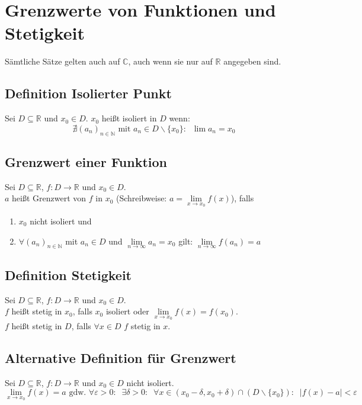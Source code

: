 \documentclass[halfparscip]{scrartcl}
\newcounter{subsection2}
\begin{document}
\newpage
\section{Grenzwerte von Funktionen und Stetigkeit}
\noindent Sämtliche Sätze gelten auch auf $\mathbb{C}$, auch wenn sie nur auf $\mathbb{R}$ angegeben sind.
\subsection{Definition Isolierter Punkt}
Sei $D \subseteq \mathbb{R}$ und $x_0 \in D$. $x_0$ heißt isoliert in $D$ wenn:
\begin{equation*}
\nexists (a_n)_{n \in \mathbb{N}} \text{ mit } a_n \in D \backslash \{x_0\}: \;\; \lim a_n = x_0
\end{equation*}

\subsection{Grenzwert einer Funktion}
Sei $D \subseteq \mathbb{R}$, $f: D \rightarrow \mathbb{R}$ und $x_0 \in D$.\\
$a$ heißt Grenzwert von $f$ in $x_0$ (Schreibweise: $a = \lim\limits_{x \rightarrow x_0} f(x)$), falls 
\begin{enumerate}[label=\alph*.]
	\item $x_0$ nicht isoliert und
	\item $\forall (a_n)_{n \in \mathbb{N}}$ mit $a_n \in D$ und $\lim\limits_{n \rightarrow \infty} a_n = x_0$ gilt: $\lim\limits_{n \rightarrow \infty} f(a_n) = a$
\end{enumerate}

\subsection{Definition Stetigkeit}
Sei $D \subseteq \mathbb{R}$, $f: D \rightarrow \mathbb{R}$ und $x_0 \in D$.\\
$f$ heißt stetig in $x_0$, falls $x_0$ isoliert oder $\lim\limits_{x \rightarrow x_0} f(x) = f(x_0)$.\\
$f$ heißt stetig in $D$, falls $\forall x \in D$ $f$ stetig in $x$.

\subsection{Alternative Definition für Grenzwert}
Sei $D \subseteq \mathbb{R}$, $f: D \rightarrow \mathbb{R}$ und $x_0 \in D$ nicht isoliert.
\begin{equation*}
	\lim\limits_{x \rightarrow x_0} f(x) = a \text{ gdw. } \forall \varepsilon > 0: \;\; \exists \delta > 0: \;\; \forall x \in (x_0 - \delta, x_0 + \delta) \cap (D \backslash \{x_0\}): \;\; \vert f(x) - a\vert < \varepsilon
\end{equation*}
\end{document}
